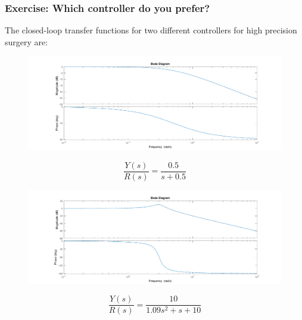 \begin{frame}
	\frametitle{Exercise: Which controller do you prefer?}
	The  closed-loop transfer functions for two different controllers for high precision surgery  are:\\
	\hspace*{-2em}
	\begin{minipage}{0.7\linewidth}
	\begin{figure}
\centering
\includegraphics[width=\columnwidth]{smooth-bode}
\label{fig:smooth-bode}
\end{figure}
\end{minipage}
\begin{minipage}{0.2\linewidth}
	\[\frac{Y(s)}{R(s)} = \frac{0.5}{s+0.5}\]
\end{minipage}

\hspace*{-2em}
\begin{minipage}{0.7\linewidth}
\begin{figure}
\centering
\includegraphics[width=\columnwidth]{osc-bode}
\label{fig:osc-bode}
\end{figure}
\end{minipage}
\begin{minipage}{0.2\linewidth}
	\[\frac{Y(s)}{R(s)} = \frac{10}{1.09s^2 + s + 10}\]
\end{minipage}
\end{frame}


